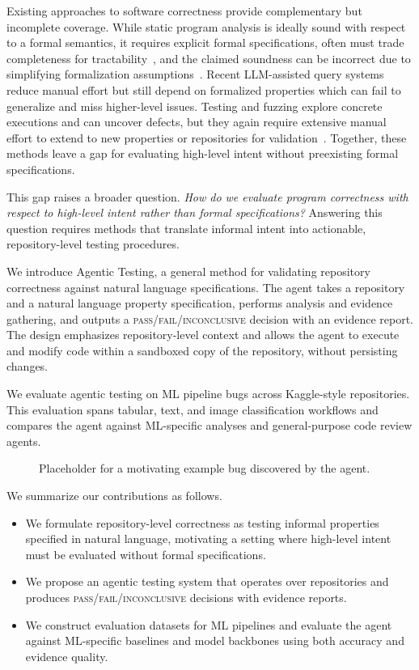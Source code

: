 \documentclass[11pt]{article}
\begin{document}
Existing approaches to software correctness provide complementary but incomplete coverage.
While static program analysis is ideally sound with respect to a formal semantics, it requires explicit formal specifications, often must trade completeness for tractability~\citep{cousot1979systematic,nielson1999principles}, and the claimed soundness can be incorrect due to simplifying formalization assumptions~\citep{java-unsound}.
Recent LLM-assisted query systems reduce manual effort but still depend on formalized properties which can fail to generalize and miss higher-level issues.
Testing and fuzzing explore concrete executions and can uncover defects, but they again require extensive manual effort to extend to new properties or repositories for validation~\citep{manes2018fuzzing}.
Together, these methods leave a gap for evaluating high-level intent without preexisting formal specifications.

This gap raises a broader question.
\textit{How do we evaluate program correctness with respect to high-level intent rather than formal specifications?}
Answering this question requires methods that translate informal intent into actionable, repository-level testing procedures.

We introduce Agentic Testing, a general method for validating repository correctness against natural language specifications.
The agent takes a repository and a natural language property specification, performs analysis and evidence gathering, and outputs a \textsc{pass}/\textsc{fail}/\textsc{inconclusive} decision with an evidence report.
The design emphasizes repository-level context and allows the agent to execute and modify code within a sandboxed copy of the repository, without persisting changes.

We evaluate agentic testing on ML pipeline bugs across Kaggle-style repositories.
This evaluation spans tabular, text, and image classification workflows and compares the agent against ML-specific analyses and general-purpose code review agents.

\begin{figure}[t]
  \centering
  \caption{Placeholder for a motivating example bug discovered by the agent.}
  \label{fig:motivating-bug}
\end{figure}

We summarize our contributions as follows.
\begin{itemize}
  \item We formulate repository-level correctness as testing informal properties specified in natural language, motivating a setting where high-level intent must be evaluated without formal specifications.
  \item We propose an agentic testing system that operates over repositories and produces \textsc{pass}/\textsc{fail}/\textsc{inconclusive} decisions with evidence reports.
  \item We construct evaluation datasets for ML pipelines and evaluate the agent against ML-specific baselines and model backbones using both accuracy and evidence quality.
\end{itemize}
\end{document}

